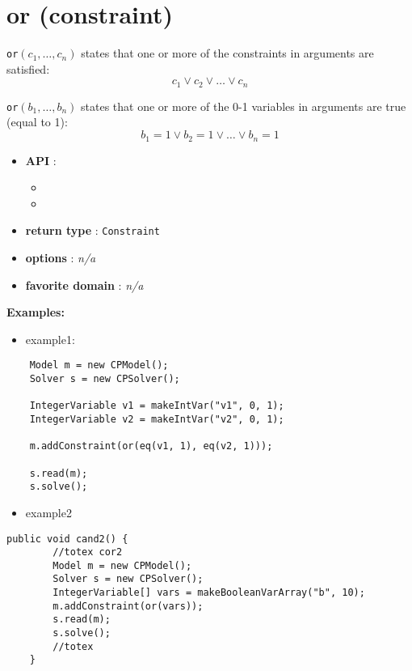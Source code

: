 \label{or}
\hypertarget{or}{}

\section{or (constraint)}\label{or:orconstraint}\hypertarget{or:orconstraint}{}
\begin{notedef}
  \texttt{or}$(c_1,\ldots,c_n)$ states that one or more of the constraints in arguments are satisfied:
$$ c_1 \lor c_2 \lor\ldots\lor c_n$$

  \texttt{or}$(b_1,\ldots,b_n)$ states that one or more of the 0-1  variables in arguments are true (equal to 1):
$$ b_1=1 \lor b_2=1 \lor\ldots\lor b_n=1$$
\end{notedef}

\begin{itemize}
\item \textbf{API} : 
\begin{itemize}
\item {}
\item {}
\end{itemize}
	\item \textbf{return type} : \texttt{Constraint}
	\item \textbf{options} : \emph{n/a}
	\item \textbf{favorite domain} : \emph{n/a}
\end{itemize}

\textbf{Examples:}
\begin{itemize}
	\item example1:
\end{itemize}
\begin{lstlisting}
	Model m = new CPModel();
	Solver s = new CPSolver();
	
	IntegerVariable v1 = makeIntVar("v1", 0, 1);
	IntegerVariable v2 = makeIntVar("v2", 0, 1);
	
	m.addConstraint(or(eq(v1, 1), eq(v2, 1)));
	
	s.read(m);
	s.solve();
\end{lstlisting}
\begin{itemize}
	\item example2
\end{itemize}
\begin{lstlisting}
public void cand2() {
        //totex cor2
        Model m = new CPModel();
        Solver s = new CPSolver();
        IntegerVariable[] vars = makeBooleanVarArray("b", 10);
        m.addConstraint(or(vars));
        s.read(m);
        s.solve();
        //totex
    }
\end{lstlisting}
